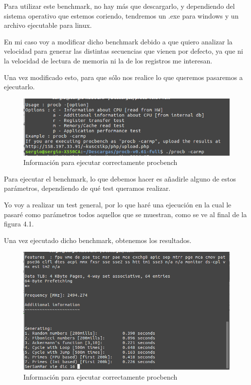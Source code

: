 Para utilizar este benchmark, no hay más que descargarlo,\cite{procbench} y dependiendo del sistema operativo que estemos coriendo, tendremos un .exe para windows y un archivo ejecutable para linux.

En mi caso voy a modificar dicho benchmark debido a que quiero analizar la velocidad para generar las distintas secuencias que vienen por defecto, ya que ni la velocidad de lectura de memoria ni la de los registros me interesan.

Una vez modificado esto, para que sólo nos realice lo que queremos pasaremos a ejecutarlo.

\begin{figure}[H] %
	\centering
	\includegraphics[scale=0.5]{imagenes/procb-info.png}  %
	\caption{Información para ejecutar correctamente procbench}
\end{figure}

Para ejecutar el benchmark, lo que debemos hacer es añadirle alguno de estos parámetros, dependiendo de qué test queramos realizar.

Yo voy a realizar un test general, por lo que haré una ejecución en la cual le pasaré como parámetros todos aquellos que se muestran, como se ve al final de la figura 4.1.

Una vez ejecutado dicho benchmark, obtenemos los resultados.

\begin{figure}[H] %
	\centering
	\includegraphics[scale=0.5]{imagenes/procbenc-run.png}  %
	\caption{Información para ejecutar correctamente procbench}
\end{figure}

